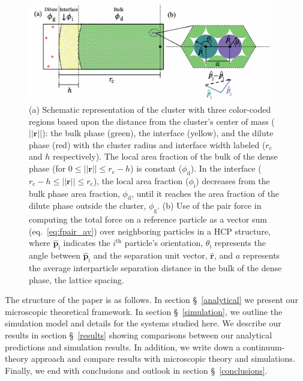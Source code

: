 \documentclass[twoside,twocolumn,9pt]{article}
\begin{document}
\begin{figure}[t]
    \centering
    \includegraphics[width=0.95\textwidth,trim={0.05cm 0.2cm 0.08cm 0.0cm},clip]{figure_1.png}
    \caption{(a) Schematic representation of the cluster with three color-coded regions based upon the distance from the cluster's center of mass ($||\mathbf{r}||$): the bulk phase (green), the interface (yellow), and the dilute phase (red) with the cluster radius and interface width labeled ($r_\text{c}$ and $h$ respectively). The local area fraction of the bulk of the dense phase (for $0\le||\mathbf{r}||\le r_\text{c}-h$) is constant ($\phi_\text{d}$).  In the interface ($r_\text{c}-h \le ||\mathbf{r}|| \le r_\text{c}$), the local area fraction ($\phi_\text{i}$) decreases from the bulk phase area fraction, $\phi_\text{d}$, until it reaches the area fraction of the dilute phase outside the cluster, $\phi_\text{g}$. (b) Use of the pair force in computing the total force on a reference particle as a vector sum (eq.~\ref{eq:fpair_av}) over neighboring particles in a HCP structure, where $\hat{\mathbf{p}}_\text{i}$ indicates the $i^\text{th}$ particle's orientation, $\theta_\text{i}$ represents the angle between $\hat{\mathbf{p}}_\text{i}$ and the separation unit vector, $\hat{\mathbf{r}}$, and $a$ represents the average interparticle separation distance in the bulk of the dense phase, the lattice spacing.}
    \label{sch}
\end{figure}

The structure of the paper is as follows. In section \S~\ref{analytical} we present our microscopic theoretical framework. In section \S~\ref{simulation}, we outline the simulation model and details for the systems studied here. We describe our results in section \S~\ref{results} showing comparisons between our analytical predictions and simulation results. In addition, we write down a continuum-theory approach and compare results with microscopic theory and simulations. Finally, we end with conclusions and outlook in section \S~\ref{conclusions}. 
\end{document}
